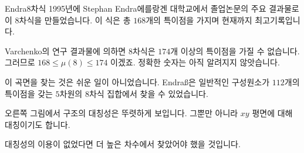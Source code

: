 \begin{surferPage}[Endraß의 $8$차식]{Endra $8$차식}
     1995년에 Stephan Endra 에를랑겐 대학교에서 졸업논문의 주요 결과물로 이 $8$차식을 만들었습니다. 이 식은 총 $168$개의 특이점을 가지며 현재까지 최고기록입니다.

    Varchenko의 연구 결과물에 의하면 $8$차식은 $174$개 이상의 특이점을 가질 수 없습니다. 그러므로 $168 \le \mu(8) \le 174$ 이겠죠. 정확한 숫자는 아직 알려지지 않앗습니다.

    이 곡면을 찾는 것은 쉬운 일이 아니었습니다. Endraß은 일반적인 구성원소가 $112$개의 특이점을 갖는 $5$차원의 $8$차식 집합에서 찾을 수 있었습니다. 
 

    오른쪽 그림에서 구조의 대칭성은 뚜렷하게 보입니다. 그뿐만 아니라 $xy$ 평면에 대해 대칭이기도 합니다. 

    대칭성의 이용이 없었다면 더 높은 차수에서 찾았어야 했을 것입니다.
\end{surferPage}
